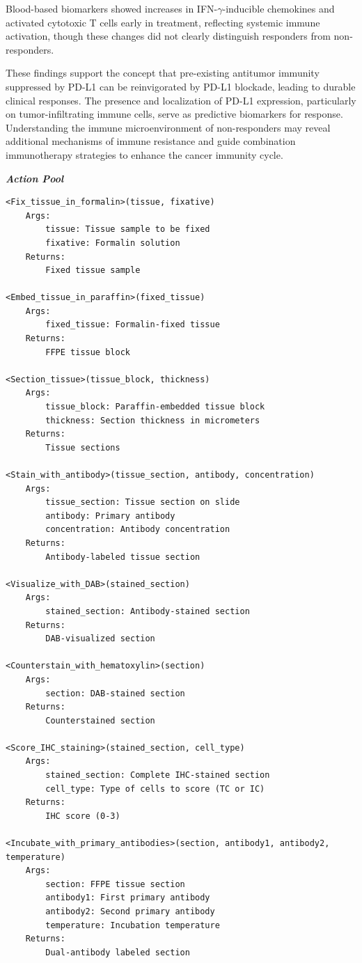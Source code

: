 \begin{tcolorbox}[
    breakable,
    title=Example of Wet Experiment in Life,
    colback=LighterGray,
    colframe=DeepPurple,
    colbacktitle=DeepPurple,
    coltitle=White,
]
Blood-based biomarkers showed increases in IFN-$\gamma$-inducible chemokines and activated cytotoxic T cells early in treatment, reflecting systemic immune activation, though these changes did not clearly distinguish responders from non-responders.

These findings support the concept that pre-existing antitumor immunity suppressed by PD-L1 can be reinvigorated by PD-L1 blockade, leading to durable clinical responses. The presence and localization of PD-L1 expression, particularly on tumor-infiltrating immune cells, serve as predictive biomarkers for response. Understanding the immune microenvironment of non-responders may reveal additional mechanisms of immune resistance and guide combination immunotherapy strategies to enhance the cancer immunity cycle.

\textbf{\emph{\textcolor{DeepPurple}{Action Pool}}}

\begin{lstlisting}
<Fix_tissue_in_formalin>(tissue, fixative)
    Args:
        tissue: Tissue sample to be fixed
        fixative: Formalin solution
    Returns:
        Fixed tissue sample

<Embed_tissue_in_paraffin>(fixed_tissue)
    Args:
        fixed_tissue: Formalin-fixed tissue
    Returns:
        FFPE tissue block

<Section_tissue>(tissue_block, thickness)
    Args:
        tissue_block: Paraffin-embedded tissue block
        thickness: Section thickness in micrometers
    Returns:
        Tissue sections

<Stain_with_antibody>(tissue_section, antibody, concentration)
    Args:
        tissue_section: Tissue section on slide
        antibody: Primary antibody
        concentration: Antibody concentration
    Returns:
        Antibody-labeled tissue section

<Visualize_with_DAB>(stained_section)
    Args:
        stained_section: Antibody-stained section
    Returns:
        DAB-visualized section

<Counterstain_with_hematoxylin>(section)
    Args:
        section: DAB-stained section
    Returns:
        Counterstained section

<Score_IHC_staining>(stained_section, cell_type)
    Args:
        stained_section: Complete IHC-stained section
        cell_type: Type of cells to score (TC or IC)
    Returns:
        IHC score (0-3)

<Incubate_with_primary_antibodies>(section, antibody1, antibody2, temperature)
    Args:
        section: FFPE tissue section
        antibody1: First primary antibody
        antibody2: Second primary antibody
        temperature: Incubation temperature
    Returns:
        Dual-antibody labeled section


\end{lstlisting}
\end{tcolorbox}
